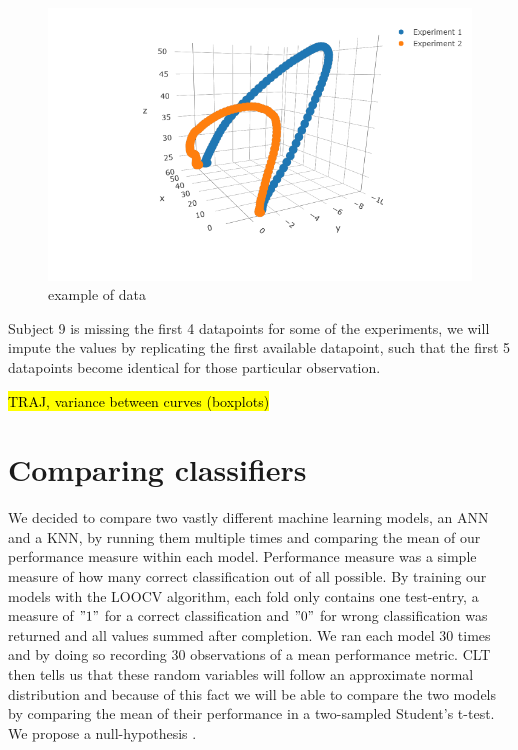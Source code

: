 \documentclass{article}
\begin{document}
\begin{figure}[H]
\includegraphics[width=\linewidth]{curve.png}
\caption{example of data}
\label{fig:trajectory}
\end{figure}

\noindent Subject 9 is missing the first 4 datapoints for some of the experiments, we will impute the values by replicating the first available datapoint, such that the first 5 datapoints become identical for those particular observation.

\hl{TRAJ, variance between curves (boxplots)}

\section{Comparing classifiers}
We decided to compare two vastly different machine learning models, an ANN and a KNN, by running them multiple times and comparing the mean of our performance measure within each model. Performance measure was a simple measure of how many correct classification out of all possible. By training our models with the LOOCV algorithm, each fold only contains one test-entry, a measure of $"1"$ for a correct classification and $"0"$ for wrong classification was returned and all values summed after completion. We ran each model 30 times and by doing so recording 30 observations of a mean performance metric. CLT then tells us that these random variables will follow an approximate normal distribution and because of this fact we will be able to compare the two models by comparing the mean of their performance in a two-sampled Student's t-test.\\



We propose a null-hypothesis . 
\end{document}
